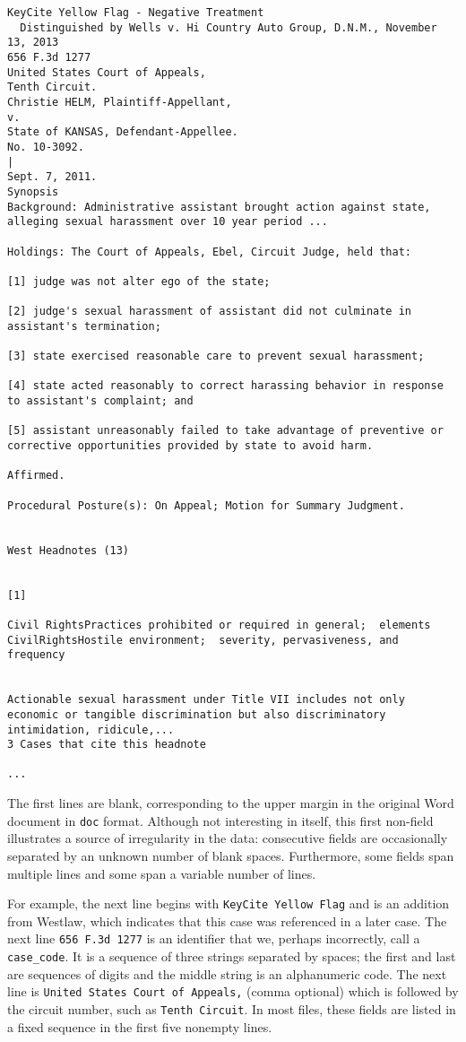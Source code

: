 \documentclass[11pt]{paper}
\begin{document}
\begin{verbatim}
KeyCite Yellow Flag - Negative Treatment
  Distinguished by Wells v. Hi Country Auto Group, D.N.M., November 13, 2013
656 F.3d 1277
United States Court of Appeals,
Tenth Circuit.
Christie HELM, Plaintiff-Appellant,
v.
State of KANSAS, Defendant-Appellee.
No. 10-3092.
|
Sept. 7, 2011.
Synopsis
Background: Administrative assistant brought action against state, alleging sexual harassment over 10 year period ...

Holdings: The Court of Appeals, Ebel, Circuit Judge, held that:
 
[1] judge was not alter ego of the state;

[2] judge's sexual harassment of assistant did not culminate in assistant's termination;
 
[3] state exercised reasonable care to prevent sexual harassment;
 
[4] state acted reasonably to correct harassing behavior in response to assistant's complaint; and
 
[5] assistant unreasonably failed to take advantage of preventive or corrective opportunities provided by state to avoid harm.
 
Affirmed.
 
Procedural Posture(s): On Appeal; Motion for Summary Judgment.


West Headnotes (13)


[1]

Civil RightsPractices prohibited or required in general;  elements
CivilRightsHostile environment;  severity, pervasiveness, and frequency


Actionable sexual harassment under Title VII includes not only economic or tangible discrimination but also discriminatory intimidation, ridicule,...
3 Cases that cite this headnote

...

\end{verbatim}

The first lines are blank, corresponding to the upper margin in the original Word document in \texttt{doc} format. 
Although not interesting in itself, this first non-field illustrates a source of irregularity in the data:
consecutive fields are occasionally separated by an unknown number of blank spaces. 
Furthermore, some fields span multiple lines and some span a variable number of lines. 

For example, the next line begins with \texttt{KeyCite Yellow Flag} and is an addition from Westlaw, 
which indicates that this case was referenced in a later case. 
The next line \texttt{656 F.3d 1277} is an identifier that we, perhaps incorrectly, call a \texttt{case\_code}. 
It is a sequence of three strings separated by spaces; the first and last are sequences of digits and the middle string is an alphanumeric code. 
The next line is \texttt{United States Court of Appeals,} (comma optional) which is followed by the circuit number, 
such as \texttt{Tenth Circuit}. 
In most files, these fields are listed in a fixed sequence in the first five nonempty lines. 
\end{document}
